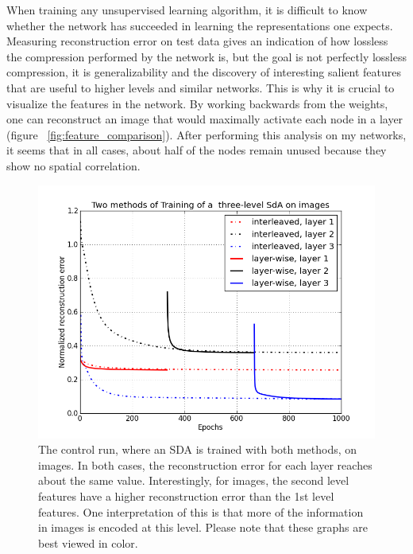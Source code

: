 \documentclass[12pt]{article}
\begin{document}
\begin{doublespacing}
	When training any unsupervised learning algorithm, it is difficult to know whether the network has succeeded in learning the representations one expects. Measuring reconstruction error on test data gives an indication of how lossless the compression performed by the network is, but the goal is not perfectly lossless compression, it is generalizability and the discovery of interesting salient features that are useful to higher levels and similar networks. This is why it is crucial to visualize the features in the network. By working backwards from the weights, one can reconstruct an image that would maximally activate each node in a layer (figure ~\ref{fig:feature_comparison}). After performing this analysis on my networks, it seems that in all cases, about half of the nodes remain unused because they show no spatial correlation. 
	
\begin{figure}[p]
\centering
\includegraphics[width=6in]{graph_image_only}
\caption{The control run, where an SDA is trained with both methods, on images. In both cases, the reconstruction error for each layer reaches about the same value. Interestingly, for images, the second level features have a higher reconstruction error than the 1st level features. One interpretation of this is that more of the information in images is encoded at this level. Please note that these graphs are best viewed in color.}
\label{fig:graph_image_only}
\end{figure}


\end{doublespacing}
\end{document}
